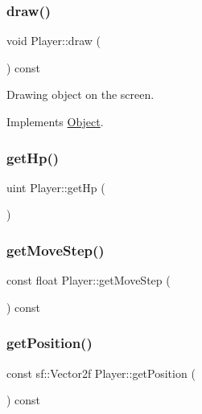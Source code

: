 \subsubsection{\texorpdfstring{draw()}{draw()}}
{\footnotesize\ttfamily void Player\+::draw (\begin{DoxyParamCaption}\item[{\mbox{\hyperlink{class_game_engine}{Game\+Engine}} $\ast$}]{ }\end{DoxyParamCaption}) const\hspace{0.3cm}{\ttfamily [virtual]}}



Drawing object on the screen. 



Implements \mbox{\hyperlink{class_object_af9862406dcd271bd45580737df468af4}{Object}}.

\mbox{\label{class_player_ad9329ace9778fed6665610d53842f37a}} 
\subsubsection{\texorpdfstring{getHp()}{getHp()}}
{\footnotesize\ttfamily uint Player\+::get\+Hp (\begin{DoxyParamCaption}{ }\end{DoxyParamCaption})\hspace{0.3cm}{\ttfamily [inline]}}

\mbox{\label{class_player_afb255210e4ca1d463c18b4a5aa26a1e0}} 
\subsubsection{\texorpdfstring{getMoveStep()}{getMoveStep()}}
{\footnotesize\ttfamily const float Player\+::get\+Move\+Step (\begin{DoxyParamCaption}{ }\end{DoxyParamCaption}) const\hspace{0.3cm}{\ttfamily [inline]}}

\mbox{\label{class_player_a6599dac14c1f2ac94e9160c99376333e}} 
\subsubsection{\texorpdfstring{getPosition()}{getPosition()}}
{\footnotesize\ttfamily const sf\+::\+Vector2f Player\+::get\+Position (\begin{DoxyParamCaption}{ }\end{DoxyParamCaption}) const\hspace{0.3cm}{\ttfamily [virtual]}}



